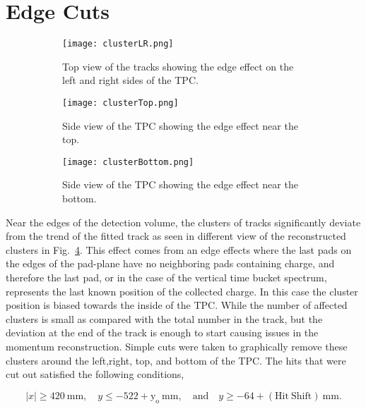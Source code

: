 \section{Edge Cuts}

\begin{figure}[!htb]

    \centering
    \begin{subfigure}[t]{0.45\textwidth}
        \centering
        \texttt{[image: clusterLR.png]} 
        \caption{Top view of the tracks showing the edge effect on the left and right sides of the TPC.} 	   \label{fig:clusterLR}
    \end{subfigure}
    \hfill
    \begin{subfigure}[t]{0.45\textwidth}
        \centering
        \texttt{[image: clusterTop.png]} 
        \caption{Side view of the TPC showing the edge effect near the top.} \label{fig:clusterTop}
    \end{subfigure}
    
    \begin{subfigure}[t]{0.45\textwidth}
        \centering
        \texttt{[image: clusterBottom.png]} 
        \caption{Side view of the TPC showing the edge effect near the bottom.} \label{fig:clusterBottom}
    \end{subfigure}
\caption{}    
\label{fig:edge}
\end{figure}

Near the edges of the detection volume, the clusters of tracks significantly deviate from the trend of the fitted track as seen in different view of the reconstructed clusters in Fig.~\ref{fig:edge}.  This effect comes from an edge effects where the last pads on the edges of the pad-plane have no neighboring pads containing charge, and therefore the last pad, or in the case of the vertical time bucket spectrum, represents the last known position of the collected charge. In this case the cluster position is biased towards the inside of the TPC. While the number of affected clusters is small as compared with the total number in the track, but the deviation at the end of the track is enough to start causing issues in the momentum reconstruction. Simple cuts were taken to graphically remove these clusters around the left,right, top, and bottom of the TPC. The hits that were cut out satisfied the following conditions, 

\begin{equation*}
  |x|\geq420~\mathrm{mm},\quad y\leq-522+\mathrm{y_o}~\mathrm{mm},
  \quad\mathrm{and}\quad y\geq-64+\mathrm{(Hit\ Shift)}~\mathrm{mm}.
\label{eq:hitshift}
\end{equation*}



